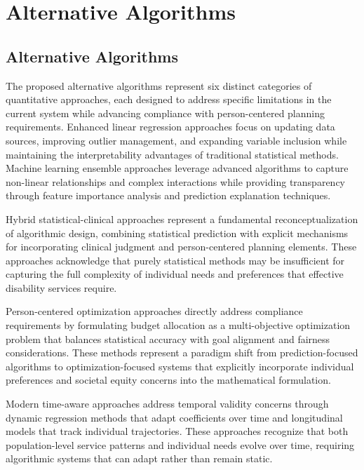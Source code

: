 \chapter{Alternative Algorithms}  \newpage

\section{Alternative Algorithms}

The proposed alternative algorithms represent six distinct categories of quantitative approaches, each designed to address specific limitations in the current system while advancing compliance with person-centered planning requirements. Enhanced linear regression approaches focus on updating data sources, improving outlier management, and expanding variable inclusion while maintaining the interpretability advantages of traditional statistical methods. Machine learning ensemble approaches leverage advanced algorithms to capture non-linear relationships and complex interactions while providing transparency through feature importance analysis and prediction explanation techniques.

Hybrid statistical-clinical approaches represent a fundamental reconceptualization of algorithmic design, combining statistical prediction with explicit mechanisms for incorporating clinical judgment and person-centered planning elements. These approaches acknowledge that purely statistical methods may be insufficient for capturing the full complexity of individual needs and preferences that effective disability services require.

Person-centered optimization approaches directly address compliance requirements by formulating budget allocation as a multi-objective optimization problem that balances statistical accuracy with goal alignment and fairness considerations. These methods represent a paradigm shift from prediction-focused algorithms to optimization-focused systems that explicitly incorporate individual preferences and societal equity concerns into the mathematical formulation.

Modern time-aware approaches address temporal validity concerns through dynamic regression methods that adapt coefficients over time and longitudinal models that track individual trajectories. These approaches recognize that both population-level service patterns and individual needs evolve over time, requiring algorithmic systems that can adapt rather than remain static.

